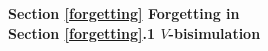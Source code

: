\documentclass{article}
\begin{document}
  \noindent\textbf{Section \ref{forgetting}   Forgetting in \CTL}\\

  \noindent\textbf{Section \ref{forgetting}.1  $V$-bisimulation}\\

\end{document}
